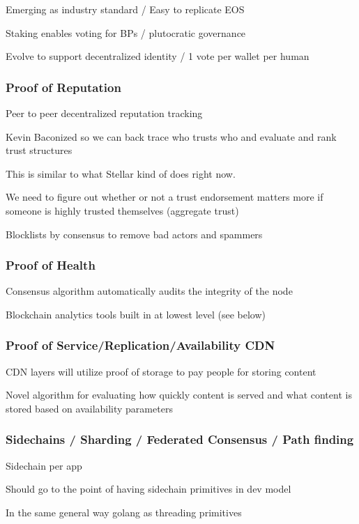 \documentclass[11pt]{article}
\begin{document}
Emerging as industry standard / Easy to replicate EOS


Staking enables voting for BPs / plutocratic governance


Evolve to support decentralized identity / 1 vote per wallet per human


\subsubsection{Proof of Reputation}

Peer to peer decentralized reputation tracking


Kevin Baconized so we can back trace who trusts who and evaluate and rank trust structures


This is similar to what Stellar kind of does right now.


We need to figure out whether or not a trust endorsement matters more if someone is highly trusted themselves (aggregate trust)


Blocklists by consensus to remove bad actors and spammers


\subsubsection{Proof of Health}

Consensus algorithm automatically audits the integrity of the node


Blockchain analytics tools built in at lowest level (see below)


\subsubsection{Proof of Service/Replication/Availability CDN}

CDN layers will utilize proof of storage to pay people for storing content


Novel algorithm for evaluating how quickly content is served and what content is stored based on availability parameters


\subsubsection{Sidechains / Sharding / Federated Consensus / Path finding}

Sidechain per app


Should go to the point of having sidechain primitives in dev model


In the same general way golang as threading primitives
\end{document}
